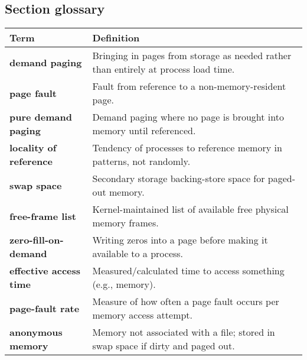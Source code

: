 \subsection*{Section glossary}
\begin{tabular}{p{}p{}}
    \toprule
    \textbf{Term} & \textbf{Definition} \\
    \midrule
    \textbf{demand paging} & Bringing in pages from storage as needed rather than entirely at process load time. \\
    \textbf{page fault} & Fault from reference to a non-memory-resident page. \\
    \textbf{pure demand paging} & Demand paging where no page is brought into memory until referenced. \\
    \textbf{locality of reference} & Tendency of processes to reference memory in patterns, not randomly. \\
    \textbf{swap space} & Secondary storage backing-store space for paged-out memory. \\
    \textbf{free-frame list} & Kernel-maintained list of available free physical memory frames. \\
    \textbf{zero-fill-on-demand} & Writing zeros into a page before making it available to a process. \\
    \textbf{effective access time} & Measured/calculated time to access something (e.g., memory). \\
    \textbf{page-fault rate} & Measure of how often a page fault occurs per memory access attempt. \\
    \textbf{anonymous memory} & Memory not associated with a file; stored in swap space if dirty and paged out. \\
    \bottomrule
\end{tabular}

